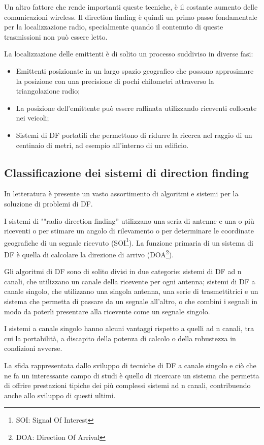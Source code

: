 Un altro fattore che rende importanti queste tecniche, è il costante aumento delle comunicazioni wireless. Il direction finding è quindi un primo passo fondamentale per la localizzazione radio, specialmente quando il contenuto di queste trasmissioni non può essere letto. 

La localizzazione delle emittenti è di solito un processo suddiviso in diverse fasi: 
\begin{itemize}
\item Emittenti posizionate in un largo spazio geografico che possono approsimare la posizione con una precisione di pochi chilometri attraverso la triangolazione radio;
\item La posizione dell'emittente può essere raffinata utilizzando riceventi collocate nei veicoli; 
\item Sistemi di DF portatili che permettono di ridurre la ricerca nel raggio di un centinaio di metri, ad esempio all'interno di un edificio.
\end{itemize}


\subsection{Classificazione dei sistemi di direction finding}

In letteratura è presente un vasto assortimento di algoritmi e sistemi per la soluzione di problemi di DF.

I sistemi di ""radio direction finding'' utilizzano una seria di antenne e una o più riceventi o per stimare un angolo di rilevamento o per determinare le coordinate geografiche di un segnale ricevuto (SOI\footnote{SOI: Signal Of Interest}). La funzione primaria di un sistema di DF è quella di calcolare la direzione di arrivo (DOA\footnote{DOA: Direction Of Arrival}). 

Gli algoritmi di DF sono di solito divisi in due categorie: sistemi di DF ad n canali, che utilizzano un canale della ricevente per ogni antenna; sistemi di DF a canale singolo, che utilizzano una singola antenna, una serie di trasmettitrici e un sistema che permetta di passare da un segnale all'altro, o che combini i segnali in modo da poterli presentare alla ricevente come un segnale singolo. 

I sistemi a canale singolo hanno alcuni vantaggi rispetto a quelli ad n canali, tra cui la portabilità, a discapito della potenza di calcolo o della robustezza in condizioni avverse. 

La sfida rappresentata dallo sviluppo di tecniche di DF a canale singolo e ciò che ne fa un interessante campo di studi è quello di ricercare un sistema che permetta di offrire prestazioni tipiche dei più complessi sistemi ad n canali, contribuendo anche allo sviluppo di questi ultimi.

